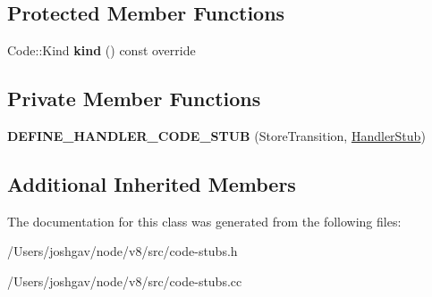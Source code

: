 \subsection*{Protected Member Functions}
\begin{DoxyCompactItemize}
\item 
Code\+::\+Kind {\bfseries kind} () const  override\hypertarget{classv8_1_1internal_1_1_store_transition_stub_ab757eac1069933e23843a9bc04ca8823}{}\label{classv8_1_1internal_1_1_store_transition_stub_ab757eac1069933e23843a9bc04ca8823}

\end{DoxyCompactItemize}
\subsection*{Private Member Functions}
\begin{DoxyCompactItemize}
\item 
{\bfseries D\+E\+F\+I\+N\+E\+\_\+\+H\+A\+N\+D\+L\+E\+R\+\_\+\+C\+O\+D\+E\+\_\+\+S\+T\+UB} (Store\+Transition, \hyperlink{classv8_1_1internal_1_1_handler_stub}{Handler\+Stub})\hypertarget{classv8_1_1internal_1_1_store_transition_stub_a9f69d8a8e789da02acde55d73885b073}{}\label{classv8_1_1internal_1_1_store_transition_stub_a9f69d8a8e789da02acde55d73885b073}

\end{DoxyCompactItemize}
\subsection*{Additional Inherited Members}


The documentation for this class was generated from the following files\+:\begin{DoxyCompactItemize}
\item 
/\+Users/joshgav/node/v8/src/code-\/stubs.\+h\item 
/\+Users/joshgav/node/v8/src/code-\/stubs.\+cc\end{DoxyCompactItemize}
